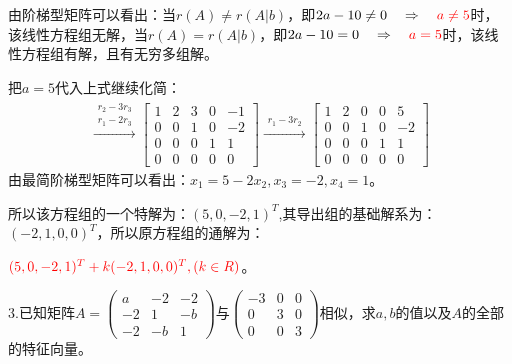\documentclass{article}
\begin{document}
\begin{jie}
由阶梯型矩阵可以看出：当$r(A)\neq r(A|b)$，即$2a-10\neq 0~~~\Rightarrow~~~\textcolor[rgb]{1.00,0.00,0.00}{a\neq 5}$时，该\textcolor[rgb]{1.00,0.00,0.00}{线性方程组无解}，当$r(A)=r(A|b)$，即$2a-10=0~~~\Rightarrow~~~\textcolor[rgb]{1.00,0.00,0.00}{a=5}$时，该\textcolor[rgb]{1.00,0.00,0.00}{线性方程组有解，且有无穷多组解}。

把$a=5$代入上式继续化简：
\begin{align*}
\xrightarrow{\substack{ r_2-3r_3 \\ r_1-2r_3}}
{
\begin{bmatrix}
1 & 2 & 3 & 0 &-1 \\
0 & 0 & 1 & 0 &-2 \\
 0 & 0 & 0& 1 &1\\
0 & 0& 0 & 0 & 0
\end{bmatrix}
}\xrightarrow{\substack{ r_1-3r_2}}
{
\begin{bmatrix}
1 & 2 & 0 & 0 &5 \\
0 & 0 & 1 & 0 &-2 \\
 0 & 0 & 0& 1 &1\\
0 & 0& 0 & 0 & 0
\end{bmatrix}
}
\end{align*}
由最简阶梯型矩阵可以看出：$x_1=5-2x_2,x_3=-2,x_4=1$。

所以该方程组的一个特解为：$(5,0,-2,1)^T$,其导出组的基础解系为：$(-2,1,0,0)^T$，所以原方程组的通解为：

$\textcolor[rgb]{1.00,0.00,0.00}{(5,0,-2,1)^T+k(-2,1,0,0)^T,(k\in R)}$。
\end{jie}

3.已知矩阵$
A=
\begin{pmatrix}
  a & -2&-2 \\
  -2 & 1 & -b\\
  -2 & -b &1
\end{pmatrix}
$与$
\begin{pmatrix}
  -3 & 0 &0 \\
  0 & 3 & 0\\
  0 & 0 &3
\end{pmatrix}
$相似，求$a,b$的值以及$A$的全部的特征向量。
\end{document}
